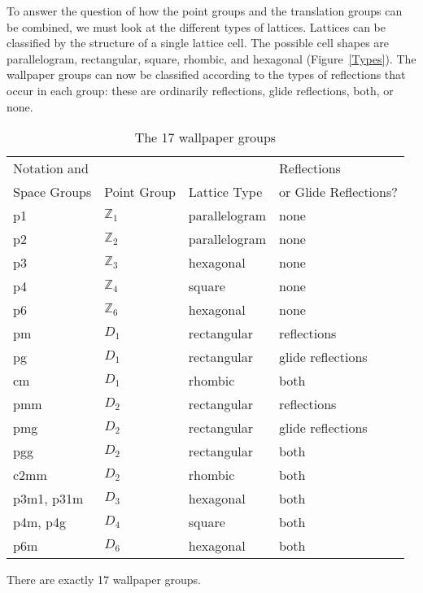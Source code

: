  
To answer the question of how the point groups and the translation
groups can be combined, we must look at the different types of
lattices. Lattices can be classified by the structure of a single
lattice cell. The possible cell shapes are parallelogram, rectangular,
square, rhombic, and hexagonal (Figure~\ref{Types}). The wallpaper
groups can now be classified according to the types of reflections
that occur in each group: these are ordinarily reflections, glide
reflections, both, or none.
 
 
 
\begin{table}[htb]
\caption{The 17 wallpaper groups}{\small
\begin{center}
\begin{tabular}{|l|l|l|l|}
\hline
Notation and &             &              & Reflections  \\
Space Groups & Point Group & Lattice Type & or Glide Reflections? \\
\hline
p1 & ${\mathbb Z}_1$ & parallelogram & none \\
p2 & ${\mathbb Z}_2$ & parallelogram & none \\
p3 & ${\mathbb Z}_3$ & hexagonal & none \\
p4 & ${\mathbb Z}_4$ & square & none \\
p6 & ${\mathbb Z}_6$ & hexagonal & none \\
pm & $D_1$ & rectangular & reflections \\
pg & $D_1$ & rectangular & glide reflections\\
cm & $D_1$ & rhombic & both \\
pmm & $D_2$ & rectangular & reflections \\
pmg & $D_2$ & rectangular & glide reflections \\
pgg & $D_2$ & rectangular & both \\
c2mm & $D_2$ & rhombic & both \\
p3m1, p31m & $D_3$ & hexagonal & both \\
p4m, p4g & $D_4$ & square & both \\
p6m & $D_6$ & hexagonal & both \\
\hline
\end{tabular} \label{table:wallpaper}
\end{center}
}
\end{table}
 
 
\begin{theorem}
There are exactly 17 wallpaper groups.
\end{theorem}
 
